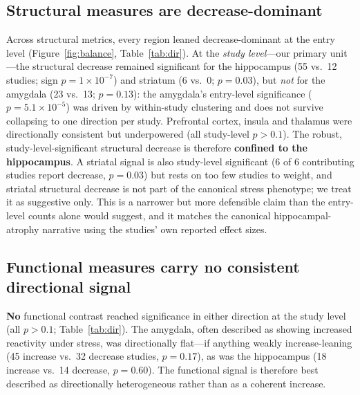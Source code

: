 \documentclass[11pt]{article}
\begin{document}
\subsection{Structural measures are decrease-dominant}
Across structural metrics, every region leaned decrease-dominant at the entry
level (Figure~\ref{fig:balance}, Table~\ref{tab:dir}). At the
\emph{study level}---our primary unit---the structural decrease remained
significant for the hippocampus (55 vs.\ 12 studies; sign $p=1\times10^{-7}$) and
striatum (6 vs.\ 0; $p=0.03$), but \emph{not} for the amygdala (23 vs.\ 13;
$p=0.13$): the amygdala's entry-level significance ($p=5.1\times10^{-5}$) was driven
by within-study clustering and does not survive collapsing to one direction per
study. Prefrontal cortex, insula and thalamus were directionally consistent but
underpowered (all study-level $p>0.1$). The robust, study-level-significant
structural decrease is therefore \textbf{confined to the hippocampus}. A striatal
signal is also study-level significant (6 of 6 contributing studies report
decrease, $p=0.03$) but rests on too few studies to weight, and striatal
structural decrease is not part of the canonical stress phenotype; we treat it as
suggestive only. This is a narrower but more defensible claim than the
entry-level counts alone would suggest, and it matches the canonical
hippocampal-atrophy narrative using the studies' own reported effect sizes.

\subsection{Functional measures carry no consistent directional signal}
\textbf{No} functional contrast reached significance in either direction at the
study level (all $p>0.1$; Table~\ref{tab:dir}). The amygdala, often described as
showing increased reactivity under stress, was directionally flat---if anything
weakly increase-leaning (45 increase vs.\ 32 decrease studies, $p=0.17$), as was
the hippocampus (18 increase vs.\ 14 decrease, $p=0.60$). The functional signal is
therefore best described as directionally heterogeneous rather than as a coherent
increase.
\end{document}
